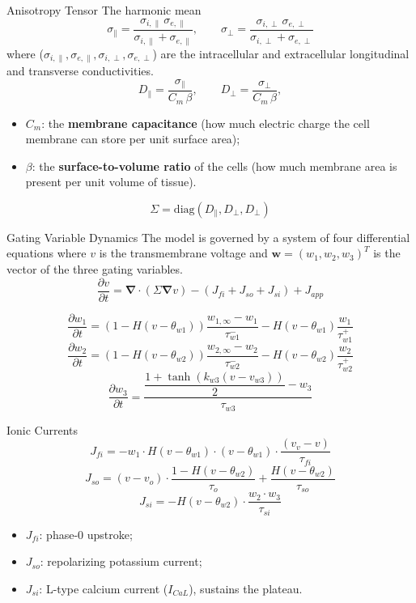 \documentclass{beamer}
\begin{document}
\begin{frame}{Anisotropy Tensor}
The harmonic mean
\[
  \sigma_{\parallel} = \frac{\sigma_{i,\parallel}\,\sigma_{e,\parallel}}
  {\sigma_{i,\parallel}+\sigma_{e,\parallel}}, \qquad
  \sigma_{\perp} = \frac{\sigma_{i,\perp}\,\sigma_{e,\perp}}
  {\sigma_{i,\perp}+\sigma_{e,\perp}}
\]
where ($\sigma_{i,\parallel}, \sigma_{e,\parallel},
\sigma_{i,\perp}, \sigma_{e,\perp}$) are the intracellular and
extracellular longitudinal and transverse conductivities.
\[
  D_{\parallel} = \frac{\sigma_{\parallel}}{C_m\,\beta}, \qquad
  D_{\perp} = \frac{\sigma_{\perp}}{C_m\,\beta},
\]
\begin{itemize}
  \item $C_m$: the \textbf{membrane capacitance} (how much electric charge
        the cell membrane can store per unit surface area);
  \item $\beta$: the \textbf{surface-to-volume ratio} of the cells (how
        much membrane area is present per unit volume of tissue).
\end{itemize}
\begin{equation*}
\Sigma = \mathrm{diag}(D_{\parallel},
D_{\perp}, D_{\perp})
\end{equation*}
    
\end{frame}

\begin{frame}{Gating Variable Dynamics}
The model is governed by a system of four differential equations where $v$ is the transmembrane voltage and $\mathbf{w}=(w_1, w_2, w_3)^T$ is the vector of the three gating variables.
\begin{equation*}
    \frac{\partial v}{\partial t} = \boldsymbol{\nabla} \cdot \left( \Sigma\boldsymbol{\nabla} v \right) - \left( J_{fi} + J_{so} + J_{si} \right) + J_{app}
    \label{eq:placeholder_label}
\end{equation*}

\[
\frac{\partial w_1}{\partial t} = (1-H(v-\theta_{w1}))\frac{w_{1,\infty}-w_1}{\tau^-_{w1}}
 - H(v-\theta_{w1})\frac{w_1}{\tau^+_{w1}}
\]
\[
\frac{\partial w_2}{\partial t} = (1-H(v-\theta_{w2}))\frac{w_{2,\infty}-w_2}{\tau^-_{w2}}
 - H(v-\theta_{w2})\frac{w_2}{\tau^+_{w2}}
\]
\[
\frac{\partial w_3}{\partial t} = \frac{\dfrac{1+\tanh(k_{w3}(v-v_{w3}))}{2} - w_3}{\tau_{w3}}
\]
\end{frame}

\begin{frame}{Ionic Currents}
\[
J_{fi} = -w_1\cdot H(v-\theta_{w1})\cdot(v-\theta_{w1})\cdot\frac{(v_v-v)}{\tau_{fi}}
\]
\[
J_{so} = (v-v_o)\cdot\frac{1-H(v-\theta_{w2})}{\tau_o} + \frac{H(v-\theta_{w2})}{\tau_{so}}
\]
\[
J_{si} = -H(v-\theta_{w2})\cdot\frac{w_2\cdot w_3}{\tau_{si}}
\]
\begin{itemize}
  \item $J_{fi}$: phase-0 upstroke;
  \item $J_{so}$: repolarizing potassium current;
  \item $J_{si}$: L-type calcium current ($I_{CaL}$), sustains the plateau.
\end{itemize}
\end{frame}
\end{document}

